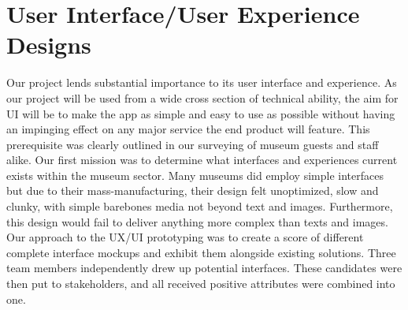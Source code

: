 \section{User Interface/User Experience Designs}
Our project lends substantial importance to its user interface and experience. As our project will be used from a wide cross section of technical ability, the aim for UI will be to make the app as simple and easy to use as possible without having an impinging effect on any major service the end product will feature. This prerequisite was clearly outlined in our surveying of museum guests and staff alike. Our first mission was to determine what interfaces and experiences current exists within the museum sector. Many museums did employ simple interfaces but due to their mass-manufacturing, their design felt unoptimized, slow and clunky, with simple barebones media not beyond text and images. Furthermore, this design would fail to deliver anything more complex than texts and images.\\
  
Our approach to the UX/UI prototyping was to create a score of different complete interface mockups and exhibit them alongside existing solutions. Three team members independently drew up potential interfaces. These candidates were then put to stakeholders, and all received positive attributes were combined into one.